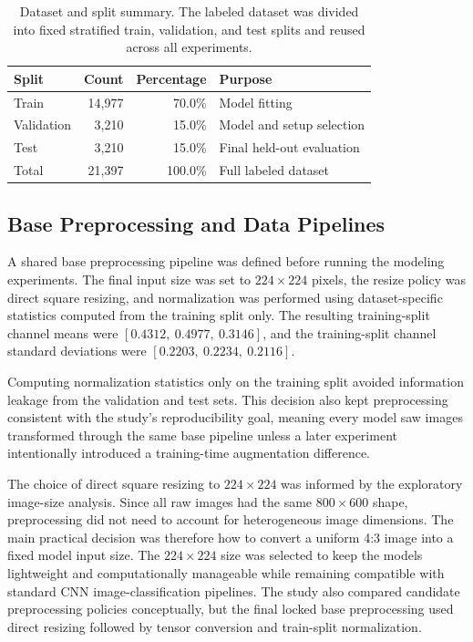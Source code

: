 \documentclass[11pt]{article}
\begin{document}
\begin{table}[htbp]
    \centering
    \caption{Dataset and split summary. The labeled dataset was divided into fixed stratified train, validation, and test splits and reused across all experiments.}
    \label{tab:dataset_split_summary}
    \begin{tabular}{lrrl}
        \toprule
        Split & Count & Percentage & Purpose \\
        \midrule
        Train & 14,977 & 70.0\% & Model fitting \\
        Validation & 3,210 & 15.0\% & Model and setup selection \\
        Test & 3,210 & 15.0\% & Final held-out evaluation \\
        \midrule
        Total & 21,397 & 100.0\% & Full labeled dataset \\
        \bottomrule
    \end{tabular}
\end{table}

\subsection{Base Preprocessing and Data Pipelines}

A shared base preprocessing pipeline was defined before running the modeling experiments. The final input size was set to \(224 \times 224\) pixels, the resize policy was direct square resizing, and normalization was performed using dataset-specific statistics computed from the training split only. The resulting training-split channel means were \([0.4312,\ 0.4977,\ 0.3146]\), and the training-split channel standard deviations were \([0.2203,\ 0.2234,\ 0.2116]\).

Computing normalization statistics only on the training split avoided information leakage from the validation and test sets. This decision also kept preprocessing consistent with the study's reproducibility goal, meaning every model saw images transformed through the same base pipeline unless a later experiment intentionally introduced a training-time augmentation difference.

The choice of direct square resizing to \(224 \times 224\) was informed by the exploratory image-size analysis. Since all raw images had the same \(800 \times 600\) shape, preprocessing did not need to account for heterogeneous image dimensions. The main practical decision was therefore how to convert a uniform 4:3 image into a fixed model input size. The \(224 \times 224\) size was selected to keep the models lightweight and computationally manageable while remaining compatible with standard CNN image-classification pipelines. The study also compared candidate preprocessing policies conceptually, but the final locked base preprocessing used direct resizing followed by tensor conversion and train-split normalization.
\end{document}
